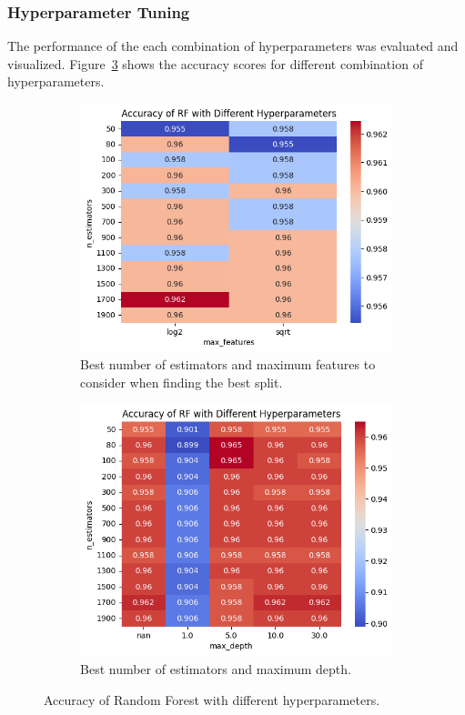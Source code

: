 \documentclass[12pt]{article}
\begin{document}
\subsubsection*{Hyperparameter Tuning}
The performance of the each combination of hyperparameters was evaluated and visualized. Figure~\ref{fig:rf_param} shows the accuracy scores for different combination of hyperparameters.
\begin{figure}[H]
    \centering
    \begin{subfigure}[b]{0.4\textwidth}
        \centering
        \includegraphics[width=\textwidth]{assets/rf/rf-param1.png}
        \caption{Best number of estimators and maximum features to consider when finding the best split.}
        \label{fig:rf_param1}
    \end{subfigure}
    \hfill
    \begin{subfigure}[b]{0.4\textwidth}
        \centering
        \includegraphics[width=\textwidth]{assets/rf/rf-param2.png}
        \caption{Best number of estimators and maximum depth.}
        \label{fig:rf_param2}
    \end{subfigure}
    \caption{Accuracy of Random Forest with different hyperparameters.}
    \label{fig:rf_param}
\end{figure}
\end{document}
